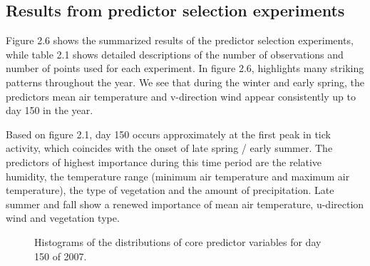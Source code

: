 \subsection{ Results from predictor selection experiments}

Figure 2.6 shows the summarized results of the predictor selection experiments, while table 2.1 shows detailed descriptions of the number of observations and number of points used for each experiment. In figure 2.6, highlights many striking patterns throughout the year. We see that during the winter and early spring, the predictors mean air temperature and v-direction wind appear consistently up to day 150 in the year. \newline

\noindent Based on figure 2.1, day 150 occurs approximately at the first peak in tick activity, which coincides with the onset of late spring / early summer. The predictors of highest importance during this time period are the relative humidity, the temperature range (minimum air temperature and maximum air temperature), the type of vegetation and the amount of precipitation. Late summer and fall show a renewed importance of mean air temperature, u-direction wind and vegetation type.  \newline

\begin{figure} [!ht]
\centerline{}
\caption{Histograms of the distributions of core predictor  variables for day 150 of 2007. }
\label{fig6}
\end{figure}


